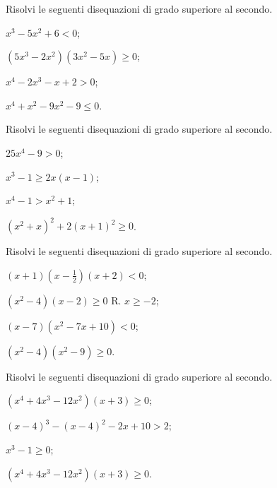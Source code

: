  \begin{esercizio}[\Ast]
\label{ese:4.41}
Risolvi le seguenti disequazioni di grado superiore al secondo.
\begin{multicols}{2}
\begin{enumeratea}
\item $x^3-5x^2+6<0$;
\item $\left(5x^3-2x^2\right)\left(3x^2-5x\right)\ge 0$;
\item $x^4-2x^3-x+2>0$;
\item $x^4+x^2-9x^2-9\le 0$.
\end{enumeratea}
\end{multicols}
 \end{esercizio}

\begin{esercizio}[\Ast]
\label{ese:4.42}
Risolvi le seguenti disequazioni di grado superiore al secondo.
\begin{multicols}{2}
\begin{enumeratea}
\item $25x^4-9>0$;
\item $x^3-1\ge 2x(x-1)$;
\item $x^4-1>x^2+1$;
\item $\left(x^2+x\right)^2+2\left(x+1\right)^2\ge 0$.
\end{enumeratea}
\end{multicols}
\end{esercizio}

\begin{esercizio}[\Ast]
 \label{ese:4.43}
Risolvi le seguenti disequazioni di grado superiore al secondo.
\begin{multicols}{2}
\begin{enumeratea}
\item $(x+1)\left(x-\frac 1 2\right)(x+2)<0$;
\item $\left(x^2-4\right)(x-2)\ge 0$ R. $x\ge -2$;
\item $(x-7)\left(x^2-7x+10\right)<0$;
\item $\left(x^2-4\right)\left(x^2-9\right)\ge 0$.
\end{enumeratea}
\end{multicols}
\end{esercizio}

\begin{esercizio}[\Ast]
 \label{ese:4.44}
Risolvi le seguenti disequazioni di grado superiore al secondo.
\begin{multicols}{2}
\begin{enumeratea}
\item $\left(x^4+4x^3-12x^2\right)\left(x+3\right)\ge 0$;
\item $(x-4)^3-(x-4)^2-2x+10>2$;
\item $x^3-1\ge 0$;
\item $\left(x^4+4x^3-12x^2\right)\left(x+3\right)\ge 0$.
\end{enumeratea}
\end{multicols}
\end{esercizio}

